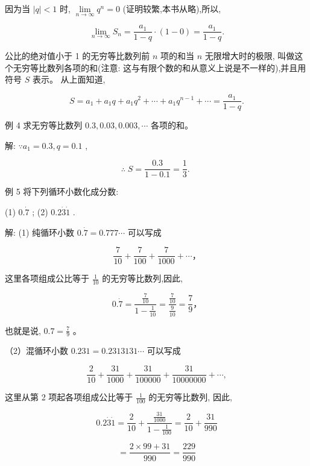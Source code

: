 \documentclass[lang=cn,newtx,12pt,scheme=chinese]{elegantbook}
\begin{document}
因为当 \(\left| q\right| < 1\) 时, \(\mathop{\lim }\limits_{{n \rightarrow \infty }}{q}^{n} = 0\) (证明较繁,本书从略),所以,

\[
\mathop{\lim }\limits_{{n \rightarrow \infty }}{S}_{n} = \frac{{a}_{1}}{1 - q} \cdot \left( {1 - 0}\right) = \frac{{a}_{1}}{1 - q}.
\]

公比的绝对值小于 1 的无穷等比数列前 \(n\) 项的和当 \(n\) 无限增大时的极限, 叫做这个无穷等比数列各项的和(注意: 这与有限个数的和从意义上说是不一样的),并且用符号 \(S\) 表示。 从上面知道,

\[
S = {a}_{1} + {a}_{1}q + {a}_{1}{q}^{2} + \cdots + {a}_{1}{q}^{n - 1} + \cdots = \frac{{a}_{1}}{1 - q}.
\]

例 4 求无穷等比数列 \({0.3},{0.03},{0.003},\cdots\) 各项的和。

解: \(\because {a}_{1} = {0.3},q = {0.1}\) ,

\[
\therefore \;S = \frac{0.3}{1 - {0.1}} = \frac{1}{3} \text{. }
\]

例 5 将下列循环小数化成分数:

(1) \(0.\dot{7}\) ; 				(2) \(0.2\dot{3}\dot{1}\) . 

解: (1) 纯循环小数 \(0.\dot{7} = {0.777}\cdots\) 可以写成

\[
\frac{7}{10} + \frac{7}{100} + \frac{7}{1000} + \cdots \text{，}
\]

这里各项组成公比等于 \(\frac{1}{10}\) 的无穷等比数列,因此,

\[
{0.\dot{7}}= \frac{\frac{7}{10}}{1 - \frac{1}{10}} = \frac{\frac{7}{10}}{\frac{9}{10}} = \frac{7}{9} \text{，}
\]

也就是说, \({0.7} = \frac{7}{9}\) 。

（2）混循环小数 \({0.231} = {0.2313131}\cdots\) 可以写成

\[
\frac{2}{10} + \frac{31}{1000} + \frac{31}{100000} + \frac{31}{10000000} + \cdots ,
\]

这里从第 2 项起各项组成公比等于 \(\frac{1}{100}\) 的无穷等比数列, 因此,

\[
{0.2}\dot{3}\dot{1} = \frac{2}{10} + \frac{\frac{31}{1000}}{1 - \frac{1}{100}} = \frac{2}{10} + \frac{31}{990}
\]

\[
= \frac{2 \times {99} + {31}}{990} = \frac{229}{990}
\]
\end{document}
